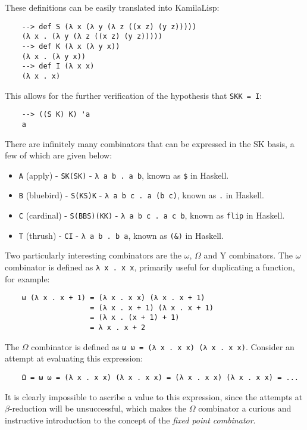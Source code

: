These definitions can be easily translated into KamilaLisp:

\begin{Verbatim}
    --> def S (λ x (λ y (λ z ((x z) (y z)))))
    (λ x . (λ y (λ z ((x z) (y z)))))
    --> def K (λ x (λ y x))
    (λ x . (λ y x))
    --> def I (λ x x)
    (λ x . x)
\end{Verbatim}

This allows for the further verification of the hypothesis that \verb|SKK = I|:

\begin{Verbatim}
    --> ((S K) K) 'a
    a
\end{Verbatim}

There are infinitely many combinators that can be expressed in the SK basis, a few of which are given below:

\begin{itemize}
    \item \verb|A| (apply) - \verb|SK(SK)| - \verb|λ a b . a b|, known as \verb|$| in Haskell.
    \item \verb|B| (bluebird) - \verb|S(KS)K| - \verb|λ a b c . a (b c)|, known as \verb|.| in Haskell.
    \item \verb|C| (cardinal) - \verb|S(BBS)(KK)| - \verb|λ a b c . a c b|, known as \verb|flip| in Haskell.
    \item \verb|T| (thrush) - \verb|CI| - \verb|λ a b . b a|, known as \verb|(&)| in Haskell.
\end{itemize}

Two particularly interesting combinators are the $\omega$, $\Omega$ and Y combinators. The $\omega$ combinator is defined as \verb|λ x . x x|, primarily useful for duplicating a function, for example:

\begin{Verbatim}
    ω (λ x . x + 1) = (λ x . x x) (λ x . x + 1)
                    = (λ x . x + 1) (λ x . x + 1)
                    = (λ x . (x + 1) + 1)
                    = λ x . x + 2
\end{Verbatim}

The $\Omega$ combinator is defined as \verb|ω ω = (λ x . x x) (λ x . x x)|. Consider an attempt at evaluating this expression:

\begin{Verbatim}
    Ω = ω ω = (λ x . x x) (λ x . x x) = (λ x . x x) (λ x . x x) = ...
\end{Verbatim}

It is clearly impossible to ascribe a value to this expression, since the attempts at $\beta$-reduction will be unsuccessful, which makes the $\Omega$ combinator a curious and instructive introduction to the concept of the \textit{fixed point combinator}.


